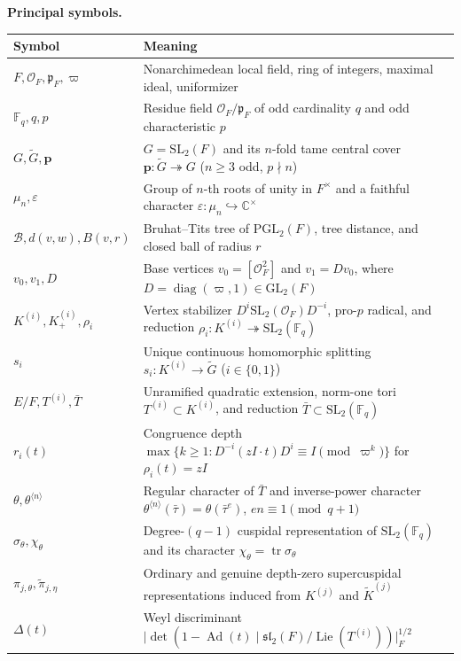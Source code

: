 \documentclass[12pt, letterpaper]{article}
\numberwithin{equation}{section}
\theoremstyle{definition}
\theoremstyle{remark}
\newcommand{\OO}{\mathcal{O}_F}
\newcommand{\kk}{\mathbb{F}_q}
\newcommand{\Gbar}{\mathrm{SL}_2(\kk)}
\newcommand{\G}{\mathrm{SL}_2(F)}
\newcommand{\wtG}{\widetilde{G}}
\newcommand{\tr}{\operatorname{tr}}
\newcommand{\Ad}{\operatorname{Ad}}
\newcommand{\Lie}{\operatorname{Lie}}
\begin{document}
\noindent\textbf{Principal symbols.}
\begin{center}
\small
\begin{tabular}{@{}lp{}@{}}
\toprule
Symbol & Meaning \\
\midrule
$F, \OO, \mathfrak{p}_F, \varpi$ & Nonarchimedean local field, ring of integers, maximal ideal, uniformizer \\
$\kk, q, p$ & Residue field $\OO/\mathfrak{p}_F$ of odd cardinality $q$ and odd characteristic $p$ \\
$G, \wtG, \mathbf{p}$ & $G=\G$ and its $n$-fold tame central cover $\mathbf{p}:\wtG\twoheadrightarrow G$ ($n\ge 3$ odd, $p\nmid n$) \\
$\mu_n, \varepsilon$ & Group of $n$-th roots of unity in $F^\times$ and a faithful character $\varepsilon:\mu_n\hookrightarrow\mathbb{C}^\times$ \\
$\mathscr{B}, d(v,w), B(v,r)$ & Bruhat--Tits tree of $\mathrm{PGL}_2(F)$, tree distance, and closed ball of radius $r$ \\
$v_0, v_1, D$ & Base vertices $v_0=[\OO^2]$ and $v_1=Dv_0$, where $D=\operatorname{diag}(\varpi,1)\in\mathrm{GL}_2(F)$ \\
$K^{(i)}, K^{(i)}_+, \rho_i$ & Vertex stabilizer $D^i\mathrm{SL}_2(\OO)D^{-i}$, pro-$p$ radical, and reduction $\rho_i:K^{(i)}\twoheadrightarrow\Gbar$ \\
$s_i$ & Unique continuous homomorphic splitting $s_i:K^{(i)}\to\wtG$ ($i\in\{0,1\}$) \\
$E/F, T^{(i)}, \bar{T}$ & Unramified quadratic extension, norm-one tori $T^{(i)}\subset K^{(i)}$, and reduction $\bar{T}\subset\Gbar$ \\
$r_i(t)$ & Congruence depth $\max\{k\ge 1:D^{-i}(zI\cdot t)D^i\equiv I\pmod{\varpi^k}\}$ for $\rho_i(t)=zI$ \\
$\theta, \theta^{\langle n\rangle}$ & Regular character of $\bar{T}$ and inverse-power character $\theta^{\langle n\rangle}(\bar{\tau})=\theta(\bar{\tau}^e)$, $en\equiv 1\pmod{q+1}$ \\
$\sigma_\theta, \chi_\theta$ & Degree-$(q-1)$ cuspidal representation of $\Gbar$ and its character $\chi_\theta=\tr\sigma_\theta$ \\
$\pi_{j,\theta}, \widetilde{\pi}_{j,\eta}$ & Ordinary and genuine depth-zero supercuspidal representations induced from $K^{(j)}$ and $\widetilde{K}^{(j)}$ \\
$\Delta(t)$ & Weyl discriminant $\bigl|\det(1-\Ad(t)\mid\mathfrak{sl}_2(F)/\Lie(T^{(i)}))\bigr|_F^{1/2}$ \\
\bottomrule
\end{tabular}
\end{center}
\end{document}
